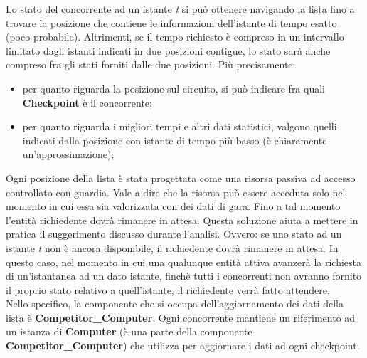      Lo stato del concorrente ad un istante \emph{t} si può ottenere navigando la lista fino a trovare la posizione che contiene le informazioni
     dell'istante di tempo esatto (poco probabile). Altrimenti, se il tempo richiesto è compreso in un intervallo limitato dagli istanti
     indicati in due posizioni contigue, lo stato sarà anche compreso fra gli stati forniti dalle due posizioni. Più precisamente:\\
     \begin{itemize}
     \item per quanto riguarda la posizione sul circuito, si può indicare fra quali \textbf{Checkpoint} è il concorrente;
     \item per quanto riguarda i migliori tempi e altri dati statistici, valgono quelli indicati dalla posizione con istante di tempo più basso (è chiaramente
     un'approssimazione);
     \end{itemize}
     Ogni posizione della lista è stata progettata come una risorsa passiva ad accesso controllato con guardia. Vale a dire che la risorsa può
     essere acceduta solo nel momento in cui essa sia valorizzata con dei dati di gara. Fino a tal momento l'entità richiedente dovrà rimanere
     in attesa. Questa soluzione aiuta a mettere in pratica il suggerimento discusso durante l'analisi. Ovvero: se uno stato ad un istante
     \emph{t} non è ancora disponibile, il richiedente dovrà rimanere in attesa. In questo caso, nel momento in cui una qualunque entità attiva
     avanzerà la richiesta di un'istantanea ad un dato istante, finchè tutti i concorrenti non avranno fornito il proprio stato relativo 
     a quell'istante, il richiedente verrà fatto attendere.\\
     Nello specifico, la componente che si occupa dell'aggiornamento dei dati della lista è \textbf{Competitor\_Computer}. Ogni concorrente
     mantiene un riferimento ad un istanza di \textbf{Computer} (è una parte della componente \textbf{Competitor\_Computer}) 
     che utilizza per aggiornare i dati ad ogni checkpoint.
